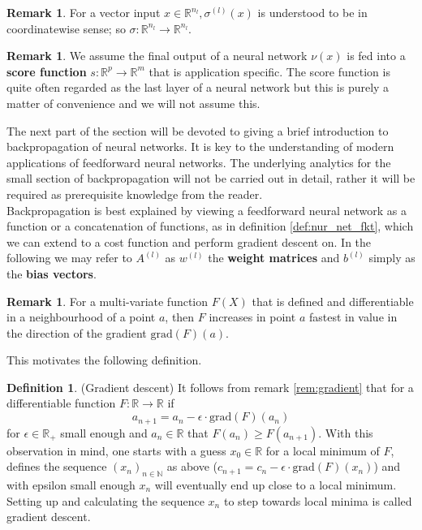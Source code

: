 \documentclass{article}
\theoremstyle{definition}
\newtheorem{definition}[theorem]{Definition}
\newtheorem{remark}[theorem]{Remark}
\begin{document}
\begin{remark}\hspace{1sp}\cite{zhang2018tropical}\label{rem:score_fkt}
For a vector input $x \in \mathbb{R}^{n_l}, \sigma^{(l)}(x)$ is understood to be in coordinatewise sense; so $\sigma : \mathbb{R}^{n_l} \to \mathbb{R}^{n_l}$.
\end{remark}
\begin{remark}\hspace{1sp}\cite{zhang2018tropical}
\label{rem:score_fkt}
We assume the final output of a neural network $\nu(x)$ is fed into a \textbf{score function} $s : \mathbb{R}^{p} \to \mathbb{R}^{m}$ that is application specific. The score function is quite often regarded as the last layer of a neural network but this is purely a matter of convenience and we will not assume this.
\end{remark}
The next part of the section will be devoted to giving a brief introduction to backpropagation of neural networks. It is key to the understanding of modern applications of feedforward neural networks. The underlying analytics for the small section of backpropagation will not be carried out in detail, rather it will be required as prerequisite knowledge from the reader. \\
Backpropagation is best explained by viewing a feedforward neural network as a function or a concatenation of functions, as in definition \ref{def:nur_net_fkt}, which we can extend to a cost function and perform gradient descent on.
In the following we may refer to $A^{(l)}$ as $w^{(l)}$ the \textbf{weight matrices} and $b^{(l)}$ simply as the \textbf{bias vectors}.

\begin{remark}
For a multi-variate function $F(X)$ that is defined and differentiable in a neighbourhood of a point $a$, then $F$ increases in point $a$ fastest in value in the direction of the gradient $\text{grad}(F)(a)$.
\end{remark}\label{rem:gradient}
This motivates the following definition.

\begin{definition}(Gradient descent)
It follows from remark \ref{rem:gradient} that for a differentiable function $F: \mathbb{R} \to \mathbb{R}$ if 
$$a_{n+1}=a_{n}-\epsilon \cdot \text{grad}(F)(a_{n})$$
for $\epsilon \in \mathbb{R}_{+}$ small enough and $a_{n} \in \mathbb{R}$ that $F(a_{n}) \geq F(a_{n+1})$. With this observation in mind, one starts with a guess $x_{0} \in \mathbb{R}$ for a local minimum of $F$, defines the sequence $(x_{n})_{n\in\mathbb{N}}$ as above ($c_{n+1}=c_{n}-\epsilon \cdot \text{grad}(F)(x_{n})$) and with epsilon small enough $x_{n}$ will eventually end up close to a local minimum. Setting up and calculating the sequence $x_{n}$ to step towards local minima is called gradient descent.
\end{definition}
\end{document}
